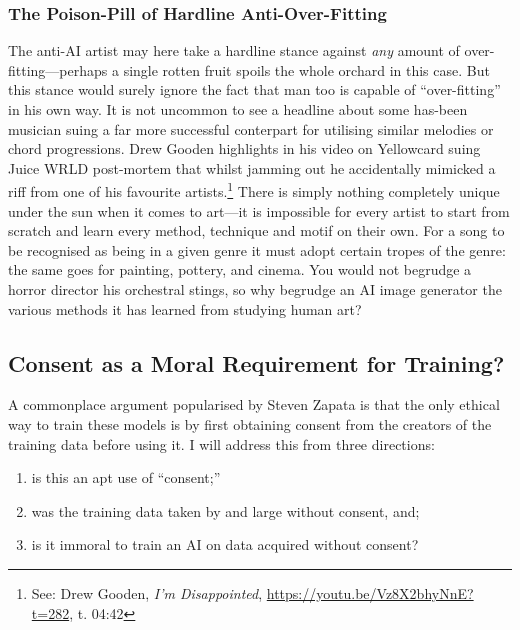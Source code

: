 \documentclass[11pt]{article}
\begin{document}
\subsubsection*{The Poison-Pill of Hardline Anti-Over-Fitting}
\label{sec:orga6e8a8b}
The anti-AI artist may here take a hardline stance against \emph{any} amount of over-fitting---perhaps a single rotten fruit spoils the whole orchard in this case. But this stance would surely ignore the fact that man too is capable of ``over-fitting'' in his own way. It is not uncommon to see a headline about some has-been musician suing a far more successful conterpart for utilising similar melodies or chord progressions. Drew Gooden highlights in his video on Yellowcard suing Juice WRLD post-mortem that whilst jamming out he accidentally mimicked a riff from one of his favourite artists.\footnote{See: Drew Gooden, \emph{I'm Disappointed}, \url{https://youtu.be/Vz8X2bhyNnE?t=282}, t. 04:42} There is simply nothing completely unique under the sun when it comes to art---it is impossible for every artist to start from scratch and learn every method, technique and motif on their own. For a song to be recognised as being in a given genre it must adopt certain tropes of the genre: the same goes for painting, pottery, and cinema. You would not begrudge a horror director his orchestral stings, so why begrudge an AI image generator the various methods it has learned from studying human art?

\subsection*{Consent as a Moral Requirement for Training?}
\label{sec:org5d6993a}
A commonplace argument popularised by Steven Zapata is that the only ethical way to train these models is by first obtaining consent from the creators of the training data before using it. I will address this from three directions:
\begin{enumerate}
\item is this an apt use of ``consent;''
\item was the training data taken by and large without consent, and;
\item is it immoral to train an AI on data acquired without consent?
\end{enumerate}
\end{document}
